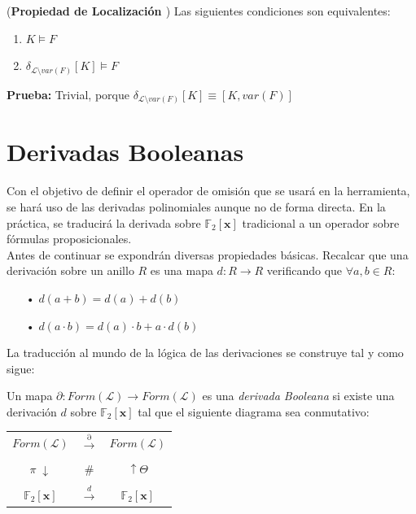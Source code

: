 \cor (\textbf{Propiedad de Localización \cite{Borrego2009}}) Las siguientes condiciones son equivalentes:
\begin{enumerate}
\item $K \vDash F$
\item $\delta_{\mathcal{L} \setminus var(F)} [K] \vDash F$
\end{enumerate}

\noindent \textbf{Prueba:} Trivial, porque $\delta_{\mathcal{L} \setminus var(F)} [K] \equiv [K,var(F)]$

\section{Derivadas Booleanas}
Con el objetivo de definir el operador de omisión que se usará en la herramienta, se hará uso de las derivadas polinomiales aunque no de forma directa. En la práctica, se traducirá la derivada sobre $\mathbb{F}_2 [\textbf{x}]$ tradicional a un operador sobre fórmulas proposicionales.\\

Antes de continuar se expondrán diversas propiedades básicas. Recalcar que una derivación sobre un anillo $R$ es una mapa $d:R \rightarrow R$ verificando que $\forall a,b \in R$:

\begin{itemize}
\item[•] $d(a+b) = d(a) + d(b)$
\item[•] $d(a \cdot b) = d(a) \cdot b + a \cdot d(b)$
\end{itemize}

La traducción al mundo de la lógica de las derivaciones se construye tal y como sigue:

 \cite{Borrego2009} Un mapa $\partial : Form(\mathcal{L}) \rightarrow Form(\mathcal{L})$ es una \textit{derivada Booleana} si existe una derivación $d$ sobre $\mathbb{F}_2 [\textbf{x}]$ tal que el siguiente diagrama sea conmutativo:

\begin{table}[h]
\centering
\begin{tabular}{ccc}
 $Form(\mathcal{L})$& $\xrightarrow{\partial} $ & $Form(\mathcal{L})$ \\ \\
 $\pi \; \downarrow $ & $\#$ & $\uparrow \Theta$ \\\\
 $\mathbb{F}_2 [\textbf{x}]$ & $\xrightarrow{d}$ & $\mathbb{F}_2 [\textbf{x}]$
\end{tabular}
\end{table}
 
